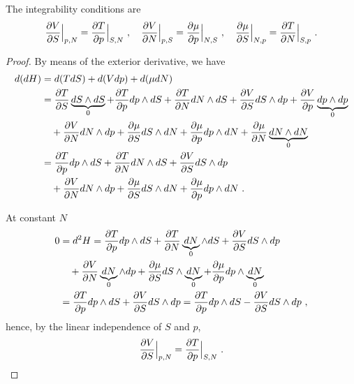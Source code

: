     The integrability conditions are 
    \begin{equation}\label{intcondent}
        \frac{\partial V}{\partial S} \Big \vert_{p,N} = \frac{\partial T}{\partial p} \Big \vert_{S,N} ~, \quad 
        \frac{\partial V}{\partial N} \Big \vert_{p,S} = \frac{\partial\mu}{\partial p} \Big \vert_{N, S} ~, \quad 
        \frac{\partial\mu}{\partial S} \Big \vert_{N,p} = \frac{\partial T}{\partial N} \Big \vert_{S, p} ~. 
    \end{equation}
    \begin{proof}
        By means of the exterior derivative, we have 
        \begin{equation*}
        \begin{aligned}
            d (dH) & = d (T dS) + d (V dp) + d (\mu dN) \\ & = \frac{\partial T}{\partial S} \underbrace{dS \wedge dS}_0 + \frac{\partial T}{\partial p} dp \wedge dS + \frac{\partial T}{\partial N} dN \wedge dS + \frac{\partial V}{\partial S} dS \wedge dp + \frac{\partial V}{\partial p} \underbrace{dp \wedge dp}_0 \\ & \quad + \frac{\partial V}{\partial N} dN \wedge dp + \frac{\partial\mu}{\partial S} dS \wedge dN + \frac{\partial\mu}{\partial p} dp \wedge dN + \frac{\partial\mu}{\partial N} \underbrace{dN \wedge dN}_0 \\ & = \frac{\partial T}{\partial p} dp \wedge dS + \frac{\partial T}{\partial N} dN \wedge dS + \frac{\partial V}{\partial S} dS \wedge dp \\ & \quad + \frac{\partial V}{\partial N} dN \wedge dp + \frac{\partial\mu}{\partial S} dS \wedge dN + \frac{\partial\mu}{\partial p} dp \wedge dN  ~.
        \end{aligned}
        \end{equation*}

        At constant $N$ 
        \begin{equation*}
        \begin{aligned}
            0 & = d^2 H = \frac{\partial T}{\partial p} dp \wedge dS + \frac{\partial T}{\partial N} \underbrace{dN}_0 \wedge dS + \frac{\partial V}{\partial S} dS \wedge dp \\ & \quad + \frac{\partial V}{\partial N} \underbrace{dN}_0 \wedge dp + \frac{\partial\mu}{\partial S} dS \wedge \underbrace{dN}_0 + \frac{\partial\mu}{\partial p} dp \wedge \underbrace{dN}_0 \\ & = \frac{\partial T}{\partial p} dp \wedge dS + \frac{\partial V}{\partial S} dS \wedge dp = \frac{\partial T}{\partial p} dp \wedge dS - \frac{\partial V}{\partial S} dS \wedge dp ~,
        \end{aligned}
        \end{equation*}
        hence, by the linear independence of $S$ and $p$,
        \begin{equation*}
            \frac{\partial V}{\partial S} \Big \vert_{p,N} = \frac{\partial T}{\partial p} \Big \vert_{S,N} ~.
        \end{equation*}


\end{proof}
